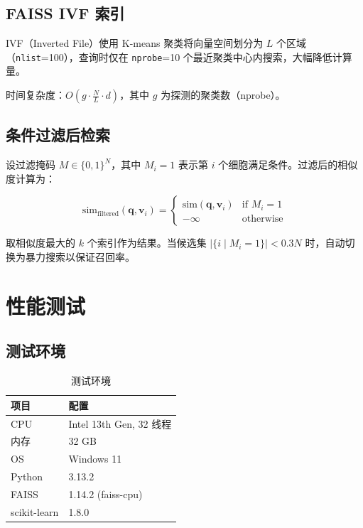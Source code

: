 \documentclass[12pt,a4paper]{ctexart}
\begin{document}
\subsection{FAISS IVF 索引}

IVF（Inverted File）使用 K-means 聚类将向量空间划分为 $L$ 个区域（\texttt{nlist}=100），查询时仅在 \texttt{nprobe}=10 个最近聚类中心内搜索，大幅降低计算量。

时间复杂度：$O(g \cdot \frac{N}{L} \cdot d)$，其中 $g$ 为探测的聚类数（nprobe）。

\subsection{条件过滤后检索}

设过滤掩码 $M \in \{0,1\}^N$，其中 $M_i = 1$ 表示第 $i$ 个细胞满足条件。过滤后的相似度计算为：

$$\text{sim}_{\text{filtered}}(\mathbf{q}, \mathbf{v}_i) = \begin{cases}
\text{sim}(\mathbf{q}, \mathbf{v}_i) & \text{if } M_i = 1 \\
-\infty & \text{otherwise}
\end{cases}$$

取相似度最大的 $k$ 个索引作为结果。当候选集 $|\{i \mid M_i=1\}| < 0.3N$ 时，自动切换为暴力搜索以保证召回率。

\section{性能测试}

\subsection{测试环境}

\begin{table}[H]
\centering
\caption{测试环境}
\begin{tabular}{l|l}
\toprule
\textbf{项目} & \textbf{配置} \\
\midrule
CPU      & Intel 13th Gen, 32 线程 \\
内存     & 32 GB \\
OS       & Windows 11 \\
Python   & 3.13.2 \\
FAISS    & 1.14.2 (faiss-cpu) \\
scikit-learn & 1.8.0 \\
\bottomrule
\end{tabular}
\end{table}
\end{document}
